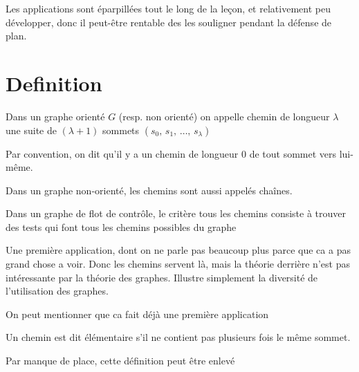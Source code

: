 
\begin{com}
	Les applications sont éparpillées tout le long de la leçon, et relativement peu développer, donc il peut-être rentable des les souligner pendant la défense de plan.
\end{com}

\section{Definition}

\begin{definition}[chemin]
	Dans un graphe orienté $G$ (resp. non orienté) on appelle chemin de longueur $\lambda$ une suite de $(\lambda + 1)$ sommets $(s_0, \, s_1, \,\dots, \, s_\lambda)$
\end{definition}

\begin{rem}
	Par convention, on dit qu’il y a un chemin de longueur 0 de tout sommet vers lui-même.
\end{rem}

\begin{rem}
	Dans un graphe non-orienté, les chemins sont aussi appelés chaînes.
\end{rem}

\begin{appl}
	Dans un graphe de flot de contrôle, le critère tous les chemins consiste à trouver des tests qui font tous les chemins possibles du graphe
\end{appl}

\begin{com}
	Une première application, dont on ne parle pas beaucoup plus parce que ca a pas grand chose a voir. Donc les chemins servent là, mais la théorie derrière n'est pas intéressante par la théorie des graphes. Illustre simplement la diversité de l'utilisation des graphes.
\end{com}

\begin{com}
	On peut mentionner que ca fait déjà une première application
\end{com}

\begin{definition}
	Un chemin est dit élémentaire s’il ne contient pas plusieurs fois le même sommet.
\end{definition}

\begin{com}
	Par manque de place, cette définition peut être enlevé
\end{com}

